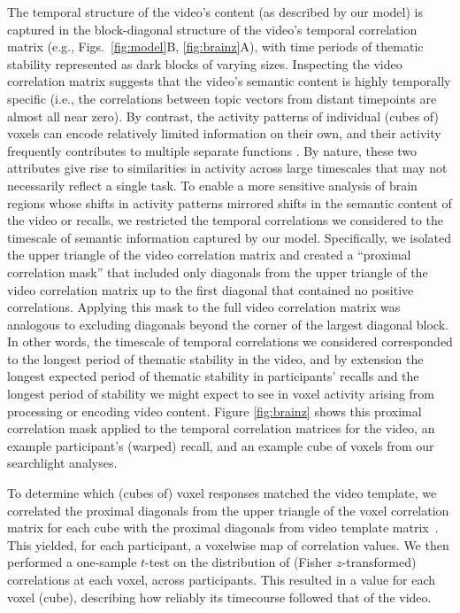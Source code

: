 \documentclass{article}
\begin{document}
The temporal structure of the video's content (as described by our model) is captured in the block-diagonal structure of the video's temporal correlation matrix (e.g., Figs.~\ref{fig:model}B, \ref{fig:brainz}A), with time periods of thematic stability represented as dark blocks of varying sizes.  Inspecting the video correlation matrix suggests that the video's semantic content is highly temporally specific (i.e., the correlations between topic vectors from distant timepoints are almost all near zero).  By contrast, the activity patterns of individual (cubes of) voxels can encode relatively limited information on their own, and their activity frequently contributes to multiple separate functions \citep{FreeEtal01, SigmDeha08, CharKoec10, RishEtal13}.  By nature, these two attributes give rise to similarities in activity across large timescales that may not necessarily reflect a single task.  To enable a more sensitive analysis of brain regions whose shifts in activity patterns mirrored shifts in the semantic content of the video or recalls, we restricted the temporal correlations we considered to the timescale of semantic information captured by our model.  Specifically, we isolated the upper triangle of the video correlation matrix and created a ``proximal correlation mask'' that included only diagonals from the upper triangle of the video correlation matrix up to the first diagonal that contained no positive correlations.  Applying this mask to the full video correlation matrix was analogous to excluding diagonals beyond the corner of the largest diagonal block.  In other words, the timescale of temporal correlations we considered corresponded to the longest period of thematic stability in the video, and by extension the longest expected period of thematic stability in participants' recalls and the longest period of stability we might expect to see in voxel activity arising from processing or encoding video content.  Figure \ref{fig:brainz} shows this proximal correlation mask applied to the temporal correlation matrices for the video, an example participant's (warped) recall, and an example cube of voxels from our searchlight analyses.

To determine which (cubes of) voxel responses matched the video template, we correlated the proximal diagonals from the upper triangle of the voxel correlation matrix for each cube with the proximal diagonals from video template matrix~\citep{KrieEtal08b}.  This yielded, for each participant, a voxelwise map of correlation values.  We then performed a one-sample $t$-test on the distribution of (Fisher $z$-transformed) correlations at each voxel, across participants.  This resulted in a value for each voxel (cube), describing how reliably its timecourse followed that of the video.
\end{document}
